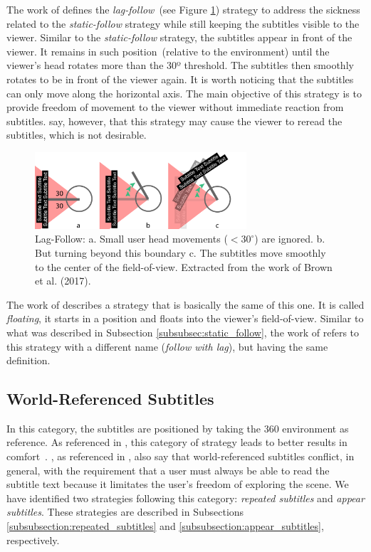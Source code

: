 The work of \cite{brown_subtitles_2017} defines the \emph{lag-follow}~(see Figure \ref{fig:lag_follow}) strategy to address the sickness related to the \emph{static-follow} strategy while still keeping the subtitles visible to the viewer. Similar to the \emph{static-follow} strategy, the subtitles appear in front of the viewer. It remains in such position~(relative to the environment) until the viewer's head rotates more than the 30º threshold. The subtitles then smoothly rotates to be in front of the viewer again. It is worth noticing that the subtitles can only move along the horizontal axis. The main objective of this strategy is to provide freedom of movement to the viewer without immediate reaction from subtitles. \cite{brown_subtitles_2017} say, however, that this strategy may cause the viewer to reread the subtitles, which is not desirable.

\begin{figure}[!ht]
    \centering
    \includegraphics[width=0.7\textwidth]{img/video360/lag-follow.png}
    \caption{Lag-Follow: a. Small user head movements ($<30^{\circ}$) are ignored. b. But turning beyond this boundary c. The subtitles move smoothly to the center of the field-of-view. Extracted from the work of Brown et al. (2017).}
    \label{fig:lag_follow}
\end{figure}

The work of \cite{matos_dynamic_2018} describes a strategy that is basically the same of this one. It is called \emph{floating}, it starts in a position and floats into the viewer's field-of-view. Similar to what was described in Subsection \ref{subsubsec:static_follow}, the work of \cite{montagud_culture_2020} refers to this strategy with a different name (\emph{follow with lag}), but having the same definition.

\subsection{World-Referenced Subtitles}
\label{subsec:world_referenced}

In this category, the subtitles are positioned by taking the 360 environment as reference. 
As referenced in \cite{hughes_disruptive_2019}, this category of strategy leads to better results in comfort~\cite{rothe2018positioning}. \cite{rothe2018positioning}, as referenced in \cite{hughes_disruptive_2019}, also say that world-referenced subtitles conflict, in general, with the requirement that a user must always be able to read the subtitle text because it limitates the user's freedom of exploring the scene.
We have identified two strategies following this category: \emph{repeated subtitles} and \emph{appear subtitles}. These strategies are described in Subsections \ref{subsubsection:repeated_subtitles} and \ref{subsubsection:appear_subtitles}, respectively. 


